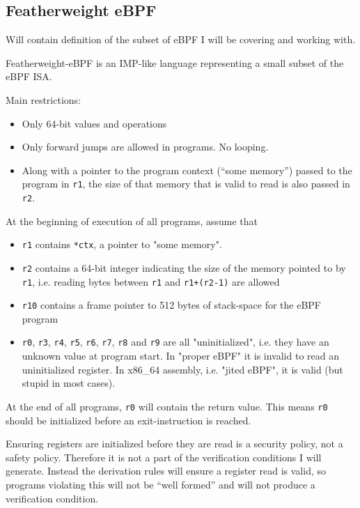 \subsection{Featherweight eBPF}
\label{subsec:featherweight_ebpf}
Will contain definition of the subset of eBPF I will be covering and working with.


Featherweight-eBPF is an IMP-like language representing a small subset of the eBPF ISA.

Main restrictions:
\begin{itemize}
\item Only 64-bit values and operations
  \item Only forward jumps are allowed in programs. No looping.
\item Along with a pointer to the program context (``some memory'') passed to the program in \texttt{r1}, the size of that memory that is valid to read is also passed in \texttt{r2}. 
\end{itemize}


At the beginning of execution of all programs, assume that
\begin{itemize}
\item \texttt{r1} contains \texttt{*ctx}, a pointer to "some memory".
\item \texttt{r2} contains a 64-bit integer indicating the size of the memory pointed to by \texttt{r1}, i.e. reading bytes between \texttt{r1} and \texttt{r1+(r2-1)} are allowed
\item \texttt{r10} contains a frame pointer to 512 bytes of stack-space for the eBPF program
\item \texttt{r0}, \texttt{r3}, \texttt{r4}, \texttt{r5}, \texttt{r6}, \texttt{r7}, \texttt{r8} and \texttt{r9} are all "uninitialized", i.e. they have an unknown value at program start. In "proper eBPF" it is invalid to read an uninitialized register. In x86\_64 assembly, i.e. "jited eBPF", it is valid (but stupid in most cases).

\end{itemize}

At the end of all programs, \texttt{r0} will contain the return value. 
This means \texttt{r0} should be initialized before an exit-instruction is reached.

Ensuring registers are initialized before they are read is a security policy, not a safety policy.
Therefore it is not a part of the verification conditions I will generate. Instead the derivation rules will ensure a register read is valid, so programs violating this will not be ``well formed'' and will not produce a verification condition. 

